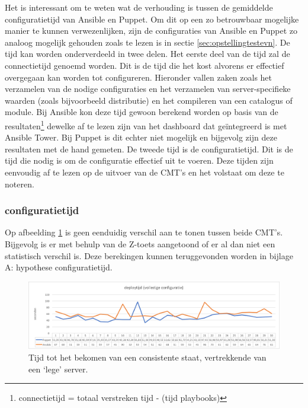Het is interessant om te weten wat de verhouding is tussen de gemiddelde \gls{configuratietijd} van Ansible en Puppet. Om dit op een zo betrouwbaar mogelijke manier te kunnen verwezenlijken, zijn de configuraties van Ansible en Puppet zo analoog mogelijk gehouden zoals te lezen is in sectie \ref{sec:opstellingtestevn}. De tijd kan worden onderverdeeld in twee delen.\newline
Het eerste deel van de tijd zal de \gls{connectietijd} genoemd worden. Dit is de tijd die het kost alvorens er effectief overgegaan kan worden tot configureren. Hieronder vallen zaken zoals het verzamelen van de nodige configuraties en het verzamelen van server-specifieke waarden (zoals bijvoorbeeld distributie) en het compileren van een catalogus of module. Bij Ansible kon deze tijd gewoon berekend worden op basis van de resultaten\footnote{connectietijd = totaal verstreken tijd -  \unexpanded{$ \sum  $} (tijd playbooks)} dewelke af te lezen zijn van het dashboard dat ge\"integreerd is met Ansible Tower. Bij Puppet is dit echter niet mogelijk en bijgevolg zijn deze resultaten met de hand gemeten.\newline
 De tweede tijd is de \gls{configuratietijd}. Dit is de tijd die nodig is om de configuratie effectief uit te voeren. Deze tijden zijn eenvoudig af te lezen op de uitvoer van de \gls{CMT}'s en het volstaat om deze te noteren.




\subsubsection{\gls{configuratietijd}}

Op afbeelding \ref{fig:deploytime_fullconfig} is geen eenduidig verschil aan te tonen tussen beide \gls{CMT}'s. Bijgevolg is er met behulp van de Z-toets aangetoond of er al dan niet een statistisch verschil is. Deze berekingen kunnen teruggevonden worden in bijlage A: hypothese configuratietijd.

\begin{figure}
	\includegraphics[width=\linewidth]{img/deploytime_fullconfig.png} 
	\caption{Tijd tot het bekomen van een consistente staat, vertrekkende van een ‘lege' server.}  
	\label{fig:deploytime_fullconfig}
\end{figure}

